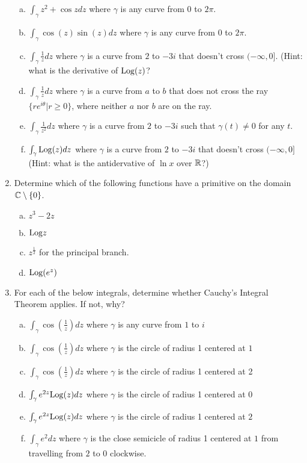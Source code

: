 \begin{enumerate}
\begin{enumerate}[a)]
\item $\int_{\gamma} z^2 + \cos zdz$ where $\gamma$ is any curve from $0$ to $2\pi$.
\item $\int_{\gamma} \cos(z)\sin(z)dz$ where $\gamma$ is any curve from $0$ to $2\pi$.
\item $\int_{\gamma} \frac{1}{z}dz$ where $\gamma$ is a curve from $2$ to $-3i$ that doesn't cross $(-\infty,0]$. (Hint: what is the derivative of $\mathrm{Log}(z)$?
\item $\int_{\gamma} \frac{1}{z}dz$ where $\gamma$ is a curve from $a$ to $b$ that does not cross the ray $\{re^{i\theta}|r \ge 0\}$, where neither $a$ nor $b$ are on the ray. 
\item $\int_{\gamma} \frac{1}{z^2}dz$ where $\gamma$ is a curve from $2$ to $-3i$ such that $\gamma(t) \ne 0$ for any $t$.
\item $\int_{\gamma} \mathrm{Log}(z)dz$ where $\gamma$ is a curve from $2$ to $-3i$ that doesn't cross $(-\infty,0]$ (Hint: what is the antidervative of $\ln x$ over $\mathbb{R}$?)
\end{enumerate}

\item Determine which of the following functions have a primitive on the domain $\mathbb{C}\setminus \{0\}$.

\begin{enumerate}[a)]
\item $z^3 - 2z$
\item $\mathrm{Log} z$
\item $z^{\frac{1}{2}}$ for the principal branch.
\item $\mathrm{Log}(e^z)$
\end{enumerate}


\item For each of the below integrals, determine whether Cauchy's Integral Theorem applies. If not, why?

\begin{enumerate}[a)]
\item $\int_{\gamma} \cos(\frac{1}{z})dz$  where $\gamma$ is any curve from $1$ to $i$
\item $\int_{\gamma} \cos(\frac{1}{z})dz$ where $\gamma$ is the circle of radius 1 centered at $1$
\item $\int_{\gamma} \cos(\frac{1}{z})dz$ where $\gamma$ is the circle of radius 1 centered at 2
\item $\int_{\gamma} e^{2z}\mathrm{Log}(z) dz$ where $\gamma$ is the circle of radius 1 centered at $0$
\item $\int_{\gamma} e^{2z}\mathrm{Log}(z) dz$ where $\gamma$ is the circle of radius 1 centered at $2$
\item $\int_{\gamma} e^{2}dz$ where $\gamma$ is the close semicicle of radius 1 centered at $1$ from travelling from $2$ to $0$ clockwise.
\end{enumerate}



\end{enumerate}
